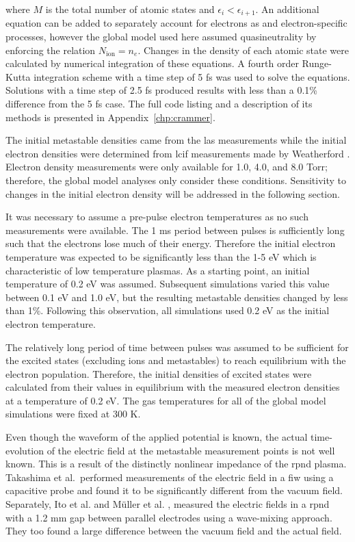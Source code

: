 where $M$ is the total number of atomic states and $\epsilon_i <
\epsilon_{i+1}$. An additional equation can be added to separately account for
electrons as and electron-specific processes, however the global model used here
assumed quasineutrality by enforcing the relation $N_\mathrm{ion}=n_e$. Changes
in the density of each atomic state were calculated by numerical integration of
these equations. A fourth order Runge-Kutta integration scheme with a time step
of 5 fs was used to solve the equations. Solutions with a time step of 2.5 fs
produced results with less than a 0.1\% difference from the 5 fs case. The full
code listing and a description of its methods is presented in
Appendix~\ref{chp:crammer}.

The initial metastable densities came from the \acs{las} measurements while the
initial electron densities were determined from \acs{lcif} measurements made by
Weatherford \cite{Weatherford2012a}. Electron density measurements were only
available for 1.0, 4.0, and 8.0 Torr; therefore, the global model analyses only
consider these conditions. Sensitivity to changes in the initial electron
density will be addressed in the following section.

It was necessary to assume a pre-pulse electron temperatures as no such
measurements were available. The 1 ms period between pulses is sufficiently long
such that the electrons lose much of their energy. Therefore the initial
electron temperature was expected to be significantly less than the 1-5 eV which
is characteristic of low temperature plasmas. As a starting point, an initial
temperature of 0.2 eV was assumed. Subsequent simulations varied this value
between 0.1 eV and 1.0 eV, but the resulting metastable densities changed by
less than 1\%. Following this observation, all simulations used 0.2 eV as the
initial electron temperature.

The relatively long period of time between pulses was assumed to be sufficient
for the excited states (excluding ions and metastables) to reach equilibrium
with the electron population. Therefore, the initial densities of excited states
were calculated from their values in equilibrium with the measured electron
densities at a temperature of 0.2 eV. The gas temperatures for all of the global
model simulations were fixed at 300 K.

Even though the waveform of the applied potential is known, the actual
time-evolution of the electric field at the metastable measurement points is not
well known. This is a result of the distinctly nonlinear impedance of the
\acs{rpnd} plasma. Takashima et al.\ performed measurements of the electric
field in a \acs{fiw} using a capacitive probe and found it to be significantly
different from the vacuum field. Separately, Ito et al. \cite{Ito2010} and
M\"{u}ller et al. \cite{Muller2011a}, measured the electric fields in a
\acs{rpnd} with a 1.2 mm gap between parallel electrodes using a wave-mixing
approach. They too found a large difference between the vacuum field and the
actual field.


